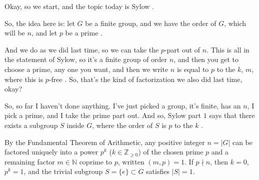 \begin{speech}[00:00:00 - 00:01:21]
Okay, so we start, and the topic today is Sylow .

So, the idea here is: let $G$ be a finite group, and we have the order of $G$, which will be $n$, and let $p$ be a prime .

And we do as we did last time, so we can take the $p$-part out of $n$. This is all in the statement of Sylow, so it's a finite group of order $n$, and then you get to choose a prime, any one you want, and then we write $n$ is equal to $p$ to the $k$, $m$, where this is $p$-free . So, that's the kind of factorization we also did last time, okay?

So, so far I haven't done anything. I've just picked a group, it's finite, has an $n$, I pick a prime, and I take the prime part out. And so, Sylow part $1$ says that there exists a subgroup $S$ inside $G$, where the order of $S$ is $p$ to the $k$ .
\end{speech}

\begin{content}

\begin{steps}
By the Fundamental Theorem of Arithmetic, any positive integer $n = |G|$ can be factored uniquely into a power $p^k$ ($k \in \mathbb{Z}_{\ge 0}$) of the chosen prime $p$ and a remaining factor $m \in \mathbb{N}$ coprime to $p$, written $(m, p) = 1$. If $p \nmid n$, then $k = 0$, $p^k = 1$, and the trivial subgroup $S = \{e\} \subset G$ satisfies $|S| = 1$.
\end{steps}
\end{content}

